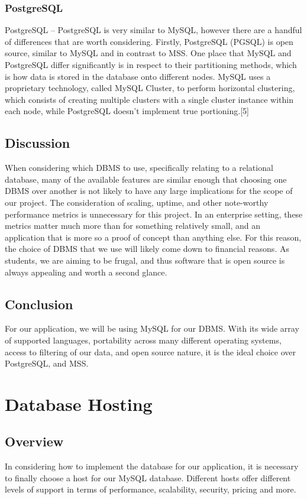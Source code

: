 \documentclass[onecolumn, draftclsnofoot,10pt, compsoc]{IEEEtran}
\begin{document}
 
\subsubsection{PostgreSQL}
PostgreSQL – PostgreSQL is very similar to MySQL, however there are a handful of differences that are worth considering. Firstly, PostgreSQL (PGSQL) is open source, similar to MySQL and in contrast to MSS. One place that MySQL and PostgreSQL differ significantly is in respect to their partitioning methods, which is how data is stored in the database onto different nodes. MySQL uses a proprietary technology, called MySQL Cluster, to perform horizontal clustering, which consists of creating multiple clusters with a single cluster instance within each node, while PostgreSQL doesn't implement true portioning.[5]

\subsection{Discussion}
When considering which DBMS to use, specifically relating to a relational database, many of the available features are similar enough that choosing one DBMS over another is not likely to have any large implications for the scope of our project. The consideration of scaling, uptime, and other note-worthy performance metrics is unnecessary for this project. In an enterprise setting, these metrics matter much more than for something relatively small, and an application that is more so a proof of concept than anything else. For this reason, the choice of DBMS that we use will likely come down to financial reasons. As students, we are aiming to be frugal, and thus software that is open source is always appealing and worth a second glance.


\subsection{Conclusion}
For our application, we will be using MySQL for our DBMS. With its wide array of supported languages, portability across many different operating systems, access to filtering of our data, and open source nature, it is the ideal choice over PostgreSQL, and MSS. 

\section{Database Hosting}

\subsection{Overview}
In considering how to implement the database for our application, it is necessary to finally choose a host for our MySQL database. Different hosts offer different levels of support in terms of performance, scalability, security, pricing and more.
\end{document}
